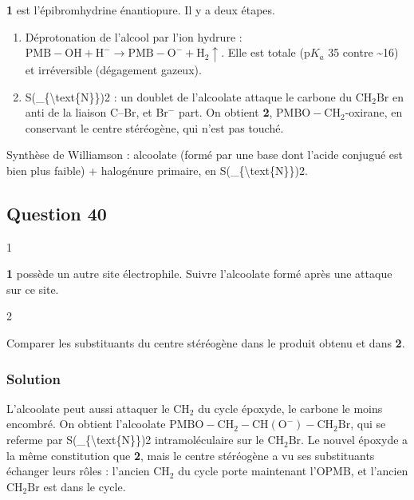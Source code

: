 \documentclass[11pt,a4paper]{article}
\providecommand{\tightlist}{\setlength{\itemsep}{0pt}\setlength{\parskip}{0pt}}
\begin{document}
\textbf{1} est l'épibromhydrine énantiopure. Il y a deux étapes.

\begin{enumerate}
\def\labelenumi{\arabic{enumi}.}
\tightlist
\item
  Déprotonation de l'alcool par l'ion hydrure : \(\mathrm{PMB{-}OH}+\mathrm{H^-}\rightarrow\mathrm{PMB{-}O^-}+\mathrm{H_2}\uparrow\). Elle est totale (p\(K_a\) 35 contre \textasciitilde16) et irréversible (dégagement gazeux).
\item
  S(\_\{\textbackslash text\{N\}\})2 : un doublet de l'alcoolate attaque le carbone du \(\mathrm{CH_2Br}\) en anti de la liaison C--Br, et Br\(^-\) part. On obtient \textbf{2}, \(\mathrm{PMBO{-}CH_2}\)-oxirane, en conservant le centre stéréogène, qui n'est pas touché.
\end{enumerate}

\begin{methode}

Synthèse de Williamson : alcoolate (formé par une base dont l'acide conjugué est bien plus faible) + halogénure primaire, en S(\_\{\textbackslash text\{N\}\})2.

\end{methode}

\hypertarget{question-40}{%
\subsection{Question 40}\label{question-40}}

\begin{indication}{1}

\textbf{1} possède un autre site électrophile. Suivre l'alcoolate formé après une attaque sur ce site.

\end{indication}

\begin{indication}{2}

Comparer les substituants du centre stéréogène dans le produit obtenu et dans \textbf{2}.

\end{indication}

\hypertarget{solution-39}{%
\subsubsection{Solution}\label{solution-39}}

L'alcoolate peut aussi attaquer le \(\mathrm{CH_2}\) du cycle époxyde, le carbone le moins encombré. On obtient l'alcoolate \(\mathrm{PMBO{-}CH_2{-}CH(O^-){-}CH_2Br}\), qui se referme par S(\_\{\textbackslash text\{N\}\})2 intramoléculaire sur le \(\mathrm{CH_2Br}\). Le nouvel époxyde a la même constitution que \textbf{2}, mais le centre stéréogène a vu ses substituants échanger leurs rôles : l'ancien \(\mathrm{CH_2}\) du cycle porte maintenant l'OPMB, et l'ancien \(\mathrm{CH_2Br}\) est dans le cycle.
\end{document}
